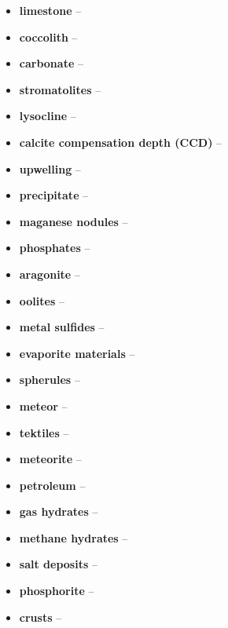 \begin{itemize}
	\item \textbf{limestone} -- 
	\item \textbf{coccolith} -- 
	\item \textbf{carbonate} -- 
	\item \textbf{stromatolites} -- 
	\item \textbf{lysocline} -- 
	\item \textbf{calcite compensation depth (CCD)} -- 
	\item \textbf{upwelling} -- 
	\item \textbf{precipitate} -- 
	\item \textbf{maganese nodules} -- 
	\item \textbf{phosphates} -- 
	\item \textbf{aragonite} -- 
	\item \textbf{oolites} -- 
	\item \textbf{metal sulfides} -- 
	\item \textbf{evaporite materials} -- 
	\item \textbf{spherules} -- 
	\item \textbf{meteor} -- 
	\item \textbf{tektiles} -- 
	\item \textbf{meteorite} -- 
	\item \textbf{petroleum} -- 
	\item \textbf{gas hydrates} -- 
	\item \textbf{methane hydrates} -- 
	\item \textbf{salt deposits} -- 
	\item \textbf{phosphorite} -- 
	\item \textbf{crusts} -- 
\end{itemize}

